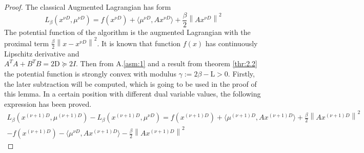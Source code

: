     \begin{proof}
        The classical Augmented Lagrangian has form
        \begin{equation*}
            L_{\beta}(x^{\nu D}, \mu^{\nu D}) = f(x^{\nu D}) + \langle \mu^{\nu D}, Ax^{\nu D}\rangle + \frac{\beta}{2}\left\lVert Ax^{\nu D}\right\rVert^2
        \end{equation*}
        The potential function of the algorithm is the augmented Lagrangian with the proximal term $\frac{\beta}{2}\left\lVert x - x^{\nu D}\right\rVert^2$. It is known that function $f(x)$ has continuously Lipschitz derivative and \\$A^TA + B^TB = 2\mathrm{D} \succeq 2I$. Then from A.\ref{asm:1} and a result from theorem \ref{thr:2.2} the potential function is strongly convex with modulus $\gamma := 2\beta - \mathrm{L} > 0$. Firstly, the later subtraction will be computed, which is going to be used in the proof of this lemma. In a certain position with different dual variable values, the following expression has been proved.
        \begin{equation*}
            \begin{align}
                L_{\beta}(x^{(\nu + 1)D}, \mu^{(\nu + 1)D})- L_{\beta}(x^{(\nu + 1)D}, \mu^{\nu D}) = f(x^{(\nu + 1)D}) + \langle \mu^{(\nu + 1)D}, Ax^{(\nu + 1)D}\rangle + \frac{\beta}{2}\left\lVert Ax^{(\nu + 1)D}\right\rVert^2 \\
                - f(x^{(\nu + 1)D}) - \langle \mu^{\nu D}, Ax^{(\nu + 1)D}\rangle - \frac{\beta}{2}\left\lVert Ax^{(\nu + 1)D}\right\rVert^2 
            \end{align}
        \end{equation*}


\end{proof}
